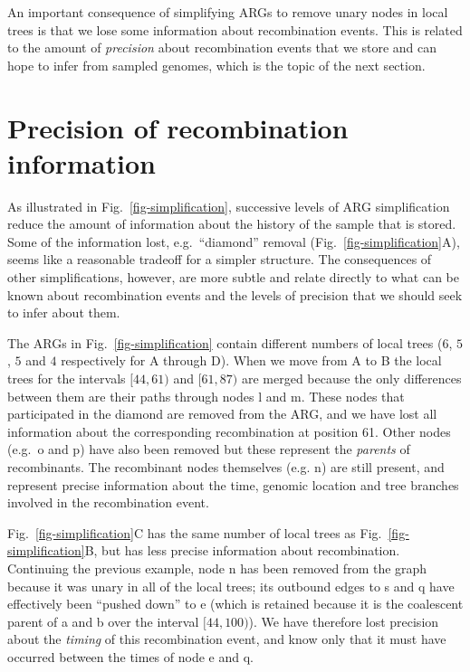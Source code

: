 \documentclass{article}
\newcommand{\noderef}[1]{\textsf{#1}}
\begin{document}
An important consequence of simplifying ARGs to remove
unary nodes in local trees is that we lose some information
about recombination
events. This is related to the amount of \emph{precision} about
recombination events that we store and
can hope to infer from sampled genomes, which is the topic of the next
section.

\section{Precision of recombination information}
\label{sec-precision}
As illustrated in Fig.~\ref{fig-simplification}, successive levels
of ARG simplification reduce the amount of information about the
history of the sample that is stored. Some of the information lost,
e.g.\ ``diamond'' removal (Fig.~\ref{fig-simplification}A),
seems like a reasonable tradeoff for a simpler structure.
The consequences of other simplifications, however, are
more subtle and relate directly to what can be known about
recombination events and the levels of precision that
we should seek to infer about them.

The ARGs in Fig.~\ref{fig-simplification} contain different
numbers of local trees ($6$, $5$, $5$ and $4$ respectively for A through
D). When we move from A to B the local trees
for the intervals $[44,61)$ and $[61,87)$ are merged because
the only differences between them are their paths through
nodes \noderef{l} and \noderef{m}. These nodes that participated
in the diamond are removed from the ARG, and we have lost
all information about the corresponding recombination at
position 61. Other nodes (e.g.\ \noderef{o} and \noderef{p})
have also been removed but these represent the \emph{parents}
of recombinants. The recombinant nodes themselves
(e.g. \noderef{n}) are still present, and represent precise
information about the time, genomic location and tree
branches involved
in the recombination event.

Fig.~\ref{fig-simplification}C has the same number of local trees
as Fig.~\ref{fig-simplification}B, but has less precise information
about recombination. Continuing the previous example, node
\noderef{n} has been removed from the graph because it was unary
in all of the local trees; its outbound edges to \noderef{s}
and \noderef{q} have effectively been ``pushed down''
to \noderef{e} (which is retained because it is the coalescent
parent of \noderef{a} and \noderef{b} over the interval
$[44, 100)$). We
have therefore lost precision about
the \emph{timing} of this recombination event, and know only
that it must have occurred between the times of node \noderef{e}
and \noderef{q}.
\end{document}
